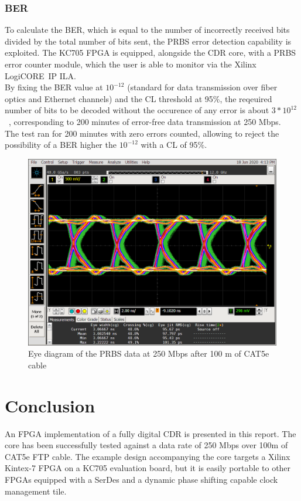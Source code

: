 \documentclass[11pt]{article}
\renewcommand{\>}{\rangle} \renewcommand{\emptyset}{\varnothing}
\begin{document}
\subsubsection{BER}
To calculate the BER, which is equal to the number of incorrectly received bits
divided by the total number of bits sent, the PRBS error detection capability is
exploited. The KC705 FPGA is equipped, alongside the CDR core, with a PRBS error
counter module, which the user is able to monitor via the Xilinx
LogiCORE\texttrademark~IP ILA.\\
By fixing the BER value at $10^{-12}$ (standard for data transmission over fiber
optics and Ethernet channels) and the CL threshold at 95\%, the reqeuired number
of bits to be decoded without the occurence of any error is about $3 *
10^{12}$~\cite{ref:ber}, corresponding to 200 minutes of error-free data
transmission at 250
Mbps.\\
The test ran for 200 minutes with zero errors counted, allowing to reject the
possibility of a BER higher the $10^{-12}$ with a CL of 95\%.
\begin{figure}[H]
  \centerline{\includegraphics[width=0.6\linewidth]{images/eye_width}}
  \caption{Eye diagram of the PRBS data at 250 Mbps after 100 m of CAT5e cable}
  \label{fig:eye}
\end{figure}

\section{Conclusion}
An FPGA implementation of a fully digital CDR is presented in this report. The
core has been successfully tested against a data rate of 250 Mbps over 100m of
CAT5e FTP cable. The example design accompanying the core targets a Xilinx
Kintex-7 FPGA on a KC705 evaluation board, but it is easily portable to other
FPGAs equipped with a SerDes and a dynamic phase shifting capable clock
management tile.
\end{document}
